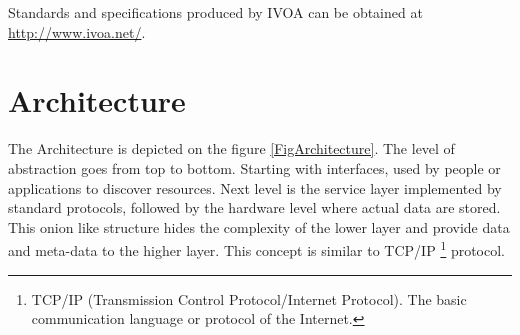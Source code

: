     Standards and specifications produced by IVOA can be obtained at
    \url{http://www.ivoa.net/}.



\section{Architecture}

 
The Architecture is depicted on the figure \ref{FigArchitecture}. The
level of abstraction goes from top to bottom. Starting with interfaces,
used by people or applications to discover resources.  Next level is
the service layer implemented by standard protocols, followed by the
hardware level where actual data are stored. This onion like structure
hides the complexity of the lower layer and provide data and meta-data
to the higher layer. This concept is similar to TCP/IP
\footnote{TCP/IP (Transmission Control Protocol/Internet Protocol).
  The basic communication language or protocol of the Internet.}
protocol.


